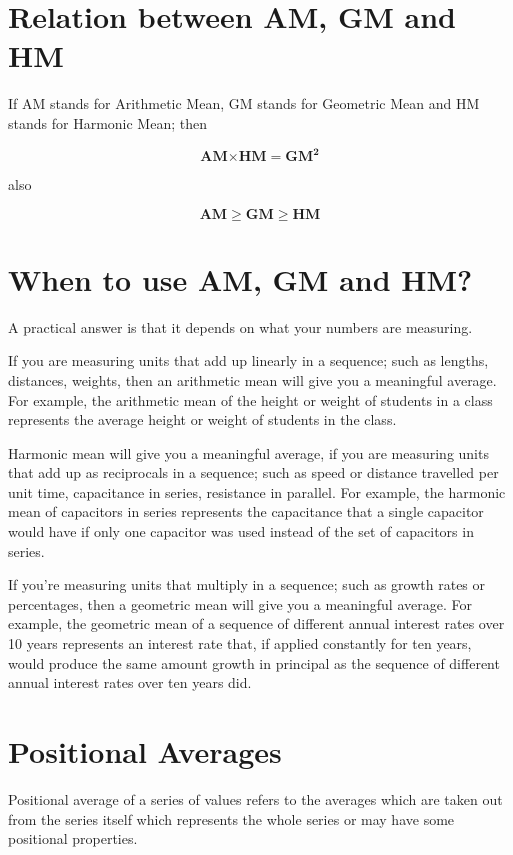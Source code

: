 \documentclass[
]{book}
\begin{document}
\section{Relation between AM, GM and HM}\label{relation-between-am-gm-and-hm}

If AM stands for Arithmetic Mean, GM stands for Geometric Mean and HM
stands for Harmonic Mean; then

\[\mathbf{\text{AM}}\mathbf{\times}\mathbf{\text{HM}}\mathbf{=}\mathbf{\text{GM}}^{\mathbf{2}}\]

also

\[\mathbf{AM \geq GM \geq HM}\]

\section{When to use AM, GM and HM?}\label{when-to-use-am-gm-and-hm}

A practical answer is that it depends on what your numbers are
measuring.

If you are measuring units that add up linearly in a sequence; such as
lengths, distances, weights, then an arithmetic mean will give you a
meaningful average. For example, the arithmetic mean of the height or
weight of students in a class represents the average height or weight of
students in the class.

Harmonic mean will give you a meaningful average, if you are measuring
units that add up as reciprocals in a sequence; such as speed or
distance travelled per unit time, capacitance in series, resistance in
parallel. For example, the harmonic mean of capacitors in series
represents the capacitance that a single capacitor would have if only
one capacitor was used instead of the set of capacitors in series.

If you're measuring units that multiply in a sequence; such as growth
rates or percentages, then a geometric mean will give you a meaningful
average. For example, the geometric mean of a sequence of different
annual interest rates over 10 years represents an interest rate that, if
applied constantly for ten years, would produce the same amount growth
in principal as the sequence of different annual interest rates over ten
years did.

\section{Positional Averages}\label{positional-averages}

Positional average of a series of values refers to the averages which
are taken out from the series itself which represents the whole series
or may have some positional properties.
\end{document}
